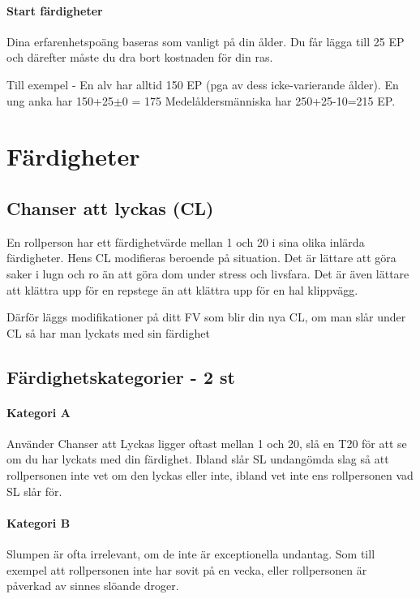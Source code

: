 \documentclass[a4paper, 10pt, titlepage]{article}
\begin{document}
\paragraph{Start färdigheter} Dina erfarenhetspoäng baseras som vanligt på din ålder. Du får
lägga till 25 EP och därefter måste du dra bort kostnaden för din ras.

Till exempel - En alv har alltid 150 EP (pga av dess icke-varierande ålder). En ung anka har 150+25$\pm$0 = 175
Medelåldersmänniska har 250+25-10=215 EP.

\section{Färdigheter}

\subsection{Chanser att lyckas (CL)}
En rollperson har ett färdighetvärde mellan 1 och 20 i sina olika inlärda färdigheter. Hens CL modifieras
beroende på situation. Det är lättare att göra saker i lugn och ro än att göra dom under stress och livsfara.
Det är även lättare att klättra upp för en repstege än att klättra upp för en hal klippvägg.

Därför läggs modifikationer på ditt FV som blir din nya CL, om man slår under CL så har man lyckats med
sin färdighet

\subsection{Färdighetskategorier - 2 st}

\paragraph{Kategori A} Använder Chanser att Lyckas ligger oftast mellan 1 och 20, slå en T20 för att
se om du har lyckats med din färdighet. Ibland slår SL undangömda slag så att rollpersonen inte vet om
den lyckas eller inte, ibland vet inte ens rollpersonen vad SL slår för.

\paragraph{Kategori B} Slumpen är ofta irrelevant, om de inte är exceptionella undantag. Som till exempel
att rollpersonen inte har sovit på en vecka, eller rollpersonen är påverkad av sinnes slöande droger.
\end{document}
